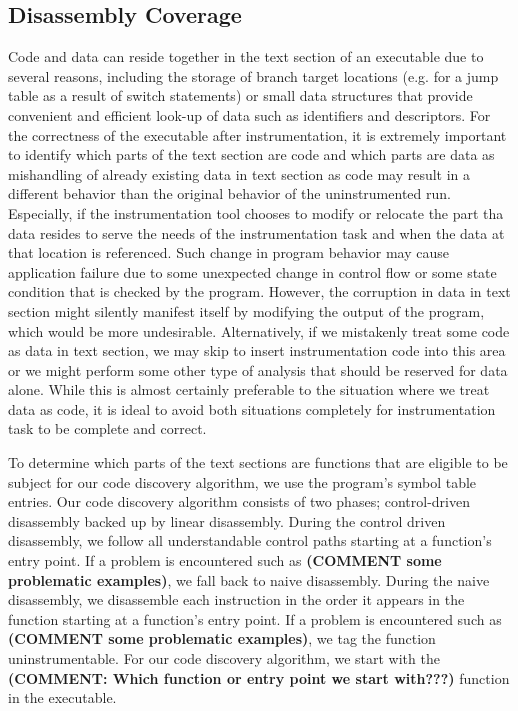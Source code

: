 \subsection{Disassembly Coverage}
Code and data can reside together in the text section of an executable due to several reasons, including
the storage of branch target locations (e.g. for a jump table as a result of switch statements) or small data structures 
that provide convenient and efficient look-up of data such as identifiers and descriptors. 
For the correctness of the executable after instrumentation, it is extremely important to identify  which parts of the text 
section are code and which parts are data as mishandling of already existing data in text section as code 
may result in a different behavior than the original behavior of the uninstrumented run.
Especially, if the instrumentation tool chooses to modify or relocate the part tha data resides 
to serve the needs of the instrumentation task and when the data at that location is referenced. 
Such change in program behavior may cause application failure due to some unexpected change in control flow 
or some state condition that is checked by the program.
However, the corruption in data in text section might silently manifest itself by modifying the output of the
program, which would be more undesirable.  Alternatively, if we mistakenly treat some code as data in text section, we may skip
to insert instrumentation code into this area or we might perform some other type of analysis that should be reserved for
data alone. While this is almost certainly preferable to the situation where we treat data as code, it
is ideal to avoid both situations completely for instrumentation task to be complete and correct.

To determine which parts of the text sections are functions that are eligible to be subject for our code discovery algorithm, 
we use the program's symbol table entries. Our code discovery algorithm
consists of two phases; control-driven disassembly backed up by linear disassembly. During the control driven disassembly, 
we follow all understandable control paths starting at a function's entry point. If a problem is encountered such as 
\textbf{(COMMENT some problematic examples)}, 
we fall back to naive disassembly. During the naive disassembly, we disassemble each instruction in the order it appears in the
function starting at a function's entry point. If a problem is encountered such as \textbf{(COMMENT some problematic examples)}, 
we tag the function uninstrumentable. For our code discovery algorithm, we start with the 
\textbf{(COMMENT: Which function or entry point we start with???)} function in the executable. 


